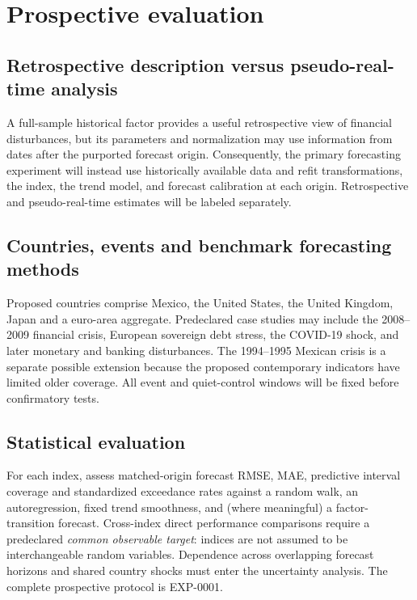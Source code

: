 \section{Prospective evaluation}
\subsection{Retrospective description versus pseudo-real-time analysis}
A full-sample historical factor provides a useful retrospective view
of financial disturbances, but its parameters and normalization may
use information from dates after the purported forecast origin.
Consequently, the primary forecasting experiment will instead use
historically available data and refit transformations, the index, the
trend model, and forecast calibration at each origin.
Retrospective and pseudo-real-time estimates will be labeled separately.

\subsection{Countries, events and benchmark forecasting methods}
Proposed countries comprise Mexico, the United States, the United
Kingdom, Japan and a euro-area aggregate. Predeclared case studies may
include the 2008--2009 financial crisis, European sovereign debt stress,
the COVID-19 shock, and later monetary and banking disturbances.
The 1994--1995 Mexican crisis is a separate possible extension because
the proposed contemporary indicators have limited older coverage.
All event and quiet-control windows will be fixed before confirmatory tests.

\subsection{Statistical evaluation}
For each index, assess matched-origin forecast RMSE, MAE, predictive
interval coverage and standardized exceedance rates against a random walk,
an autoregression, fixed trend smoothness, and (where meaningful) a
factor-transition forecast. Cross-index direct performance comparisons
require a predeclared \emph{common observable target}: indices are not
assumed to be interchangeable random variables. Dependence across
overlapping forecast horizons and shared country shocks must enter the
uncertainty analysis. The complete prospective protocol is EXP-0001.
